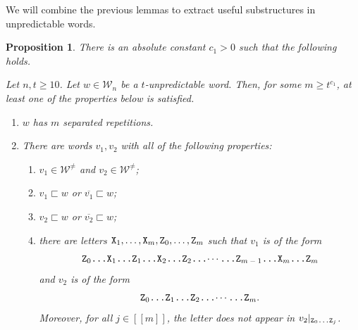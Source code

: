 \documentclass[11pt]{amsart}
\newtheorem{proposition}[theorem]{Proposition}
\theoremstyle{definition}
\renewcommand{\geq}{\geqslant}
\newcommand{\sinterval}[1]{[\![#1]\!] }
\newcommand{\upletters}[1]{{\normalfont{\texttt{#1}}}}
\newcommand{\makesubscript}[1]{\textsubscript{$#1$}}
\newcommand{\word}{\mathcal{W}}
\newcommand{\mm}{m}
\begin{document}
We will combine the previous lemmas to extract useful substructures in unpredictable words.

\begin{proposition}
\label{prop:structureunpred}
There is an absolute constant $c_1> 0$ such that the following holds.

Let $n,t\geq 10$. Let $w\in \word_n$ be a $t$-unpredictable word. Then, for some $m \geq t^{c_1}$, at least one of the properties below is satisfied.
\begin{enumerate}
	\item $w$ has $\mm$ separated repetitions.
	\item There are words $v_1, v_2$ with all of the following properties:
            \begin{enumerate}[label=(\roman*), ref=\roman*]
            	\item $v_1\in \word^{\neq}$ and $v_2\in \word^{\neq}$;
            	\item $v_1 \sqsubset w$ or $\overline{v_1} \sqsubset w$;
            	\item $v_2 \sqsubset w$ or $\overline{v_2} \sqsubset w$;
            	\item there are letters $\upletters{X\makesubscript{1}},\ldots,\upletters{X\makesubscript{\mm}},\upletters{Z\makesubscript{0}},\ldots,\upletters{Z\makesubscript{\mm}}$ such that $v_1$ is of the form
                            \begin{equation*}
                            \upletters{Z\makesubscript{0}\ldots X\makesubscript{1}\ldots Z\makesubscript{1}\ldots X\makesubscript{2}\ldots Z\makesubscript{2}\ldots$\cdots$\ldots Z\makesubscript{\mm-1}\ldots X\makesubscript{\mm}\ldots Z\makesubscript{\mm}}
                            \end{equation*}
                            and $v_2$ is of the form 
                            \begin{equation*}
                            \upletters{Z\makesubscript{0}\ldots Z\makesubscript{1}\ldots Z\makesubscript{2}\ldots$\cdots$\ldots Z\makesubscript{\mm}}.
                            \end{equation*}
                            Moreover, for all $j\in \sinterval{\mm}$, the letter \upletters{X\makesubscript{j}} does not appear in $v_2|_{\upletters{Z\makesubscript{0}\ldots Z\makesubscript{j}}}$.
            \end{enumerate}
\end{enumerate}
\end{proposition}
\end{document}

